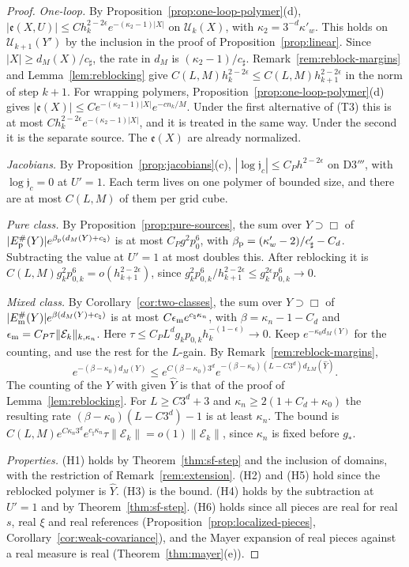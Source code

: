 \begin{proof}
\emph{One-loop.} By Proposition~\ref{prop:one-loop-polymer}(d), $|\mathfrak e(X,U)|\le Ch_k^{2-2\epsilon}e^{-(\kappa_2-1)|X|}$ on $\mathcal U_k(X)$, with $\kappa_2=3^{-d}\kappa'_w$. This holds on $\mathcal U_{k+1}(Y')$ by the inclusion in the proof of Proposition~\ref{prop:linear}. Since $|X|\ge d_M(X)/c_\sharp$, the rate in $d_M$ is $(\kappa_2-1)/c_\sharp$. Remark~\ref{rem:reblock-margins} and Lemma~\ref{lem:reblocking} give $C(L,M)h_k^{2-2\epsilon}\le C(L,M)h_{k+1}^{2-2\epsilon}$ in the norm of step $k+1$. For wrapping polymers, Proposition~\ref{prop:one-loop-polymer}(d) gives $|\mathfrak e(X)|\le Ce^{-(\kappa_2-1)|X|}e^{-cn_k/M}$. Under the first alternative of (T3) this is at most $Ch_k^{2-2\epsilon}e^{-(\kappa_2-1)|X|}$, and it is treated in the same way. Under the second it is the separate source. The $\mathfrak e(X)$ are already normalized.

\emph{Jacobians.} By Proposition~\ref{prop:jacobians}(c), $|\log\mathfrak j_c|\le C_Ph^{2-2\epsilon}$ on D3$'''$, with $\log\mathfrak j_c=0$ at $U'=1$. Each term lives on one polymer of bounded size, and there are at most $C(L,M)$ of them per grid cube.

\emph{Pure class.} By Proposition~\ref{prop:pure-sources}, the sum over $Y\supset\Box$ of $|E^\#_{\rm p}(Y)|e^{\beta_{\rm p}(d_M(Y)+c_\natural)}$ is at most $C_Pg^2p_0^6$, with $\beta_{\rm p}=(\kappa'_w-2)/c'_\sharp-C_d$. Subtracting the value at $U'=1$ at most doubles this. After reblocking it is $C(L,M)g_k^2p_{0,k}^6=o(h_{k+1}^{2-2\epsilon})$, since $g_k^2p_{0,k}^6/h_{k+1}^{2-2\epsilon}\le g_k^{2\epsilon}p_{0,k}^6\to0$.

\emph{Mixed class.} By Corollary~\ref{cor:two-classes}, the sum over $Y\supset\Box$ of $|E^\#_{\rm m}(Y)|e^{\beta(d_M(Y)+c_\natural)}$ is at most $C\epsilon_{\rm m}e^{c_\natural\kappa_n}$, with $\beta=\kappa_n-1-C_d$ and $\epsilon_{\rm m}=C_P\tau\|\mathcal E_k\|_{k,\kappa_n}$. Here $\tau\le C_PL^dg_kp_{0,k}h_k^{-(1-\epsilon)}\to0$. Keep $e^{-\kappa_0d_M(Y)}$ for the counting, and use the rest for the $L$-gain. By Remark~\ref{rem:reblock-margins},
\[
e^{-(\beta-\kappa_0)d_M(Y)}\le e^{C(\beta-\kappa_0)3^d}e^{-(\beta-\kappa_0)(L-C3^d)d_{LM}(\hat Y)} .
\]
The counting of the $Y$ with given $\hat Y$ is that of the proof of Lemma~\ref{lem:reblocking}. For $L\ge C3^d+3$ and $\kappa_n\ge2(1+C_d+\kappa_0)$ the resulting rate $(\beta-\kappa_0)(L-C3^d)-1$ is at least $\kappa_n$. The bound is $C(L,M)e^{C\kappa_n3^d}e^{c_\natural\kappa_n}\tau\|\mathcal E_k\|=o(1)\|\mathcal E_k\|$, since $\kappa_n$ is fixed before $g_*$.

\emph{Properties.} (H1) holds by Theorem~\ref{thm:sf-step} and the inclusion of domains, with the restriction of Remark~\ref{rem:extension}. (H2) and (H5) hold since the reblocked polymer is $\hat Y$. (H3) is the bound. (H4) holds by the subtraction at $U'=1$ and by Theorem~\ref{thm:sf-step}. (H6) holds since all pieces are real for real $s$, real $\xi$ and real references (Proposition~\ref{prop:localized-pieces}, Corollary~\ref{cor:weak-covariance}), and the Mayer expansion of real pieces against a real measure is real (Theorem~\ref{thm:mayer}(e)).
\end{proof}

